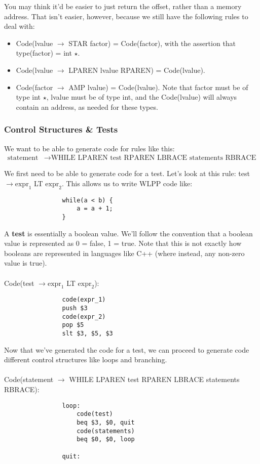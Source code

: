 \documentclass[]{article}
\theoremstyle{definition}
\newcommand{\lecture}[1]{\marginpar{{\footnotesize $\leftarrow$ \underline{#1}}}}
\begin{document}
				You may think it'd be easier to just return the offset, rather than a memory address. That isn't easier, however, because we still have the following rules to deal with:
				\begin{itemize}
					\item Code(lvalue $\to$ STAR factor) = Code(factor), with the assertion that type(factor) = int $\star$.
					\item Code(lvalue $\to$ LPAREN lvalue RPAREN) = Code(lvalue).
					\item Code(factor $\to$ AMP lvalue) = Code(lvalue). Note that factor must be of type int $\star$, lvalue must be of type int, and the Code(lvalue) will always contain an address, as needed for these types.
				\end{itemize}

			\subsubsection{Control Structures \& Tests} \lecture{March 22, 2013}
				We want to be able to generate code for rules like this:
				\begin{align*}
					\text{statement} &\to \text{WHILE LPAREN test RPAREN LBRACE statements RBRACE}
				\end{align*}

				We first need to be able to generate code for a test. Let's look at this rule: test $\to \text{expr}_1$ LT $\text{expr}_2$. This allows us to write WLPP code like:
				\begin{verbatim}
				while(a < b) {
				    a = a + 1;
				}
				\end{verbatim}

				A \textbf{test} is essentially a boolean value. We'll follow the convention that a boolean value is represented as 0 = false, 1 = true. Note that this is not exactly how booleans are represented in languages like C++ (where instead, any non-zero value is true).
				\\ \\
				Code(test $\to \text{expr}_1$ LT $\text{expr}_2$):
				\begin{verbatim}
				code(expr_1)
				push $3
				code(expr_2)
				pop $5
				slt $3, $5, $3
				\end{verbatim}

				Now that we've generated the code for a test, we can proceed to generate code different control structures like loops and branching.
				\\ \\
				Code(statement $\to$ WHILE LPAREN test RPAREN LBRACE statements RBRACE):
				\begin{verbatim}
				loop:
				    code(test)
				    beq $3, $0, quit
				    code(statements)
				    beq $0, $0, loop

				quit:
				\end{verbatim}
\end{document}

